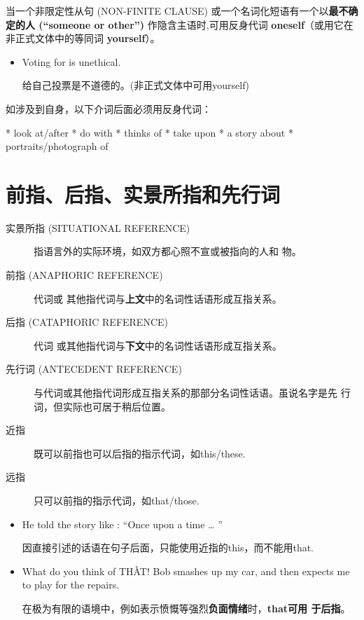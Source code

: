 当一个非限定性从句 (NON-FINITE CLAUSE) 或一个名词化短语有一个以\textbf{最不确
  定的人 (``someone or other'') }作隐含主语时,可用反身代词
\textbf{oneself}（或用它在非正式文体中的等同词 \textbf{yourself}）。
\begin{itemize}
\item Voting for  is unethical.

  给自己投票是不道德的。(非正式文体中可用yourself)
\end{itemize}

如涉及到自身，以下介词后面必须用反身代词：
\begin{taskitem}
  * look at/after
  * do with
  * thinks of
  * take upon
  * a story about
  * portraits/photograph of
\end{taskitem}

\section{前指、后指、实景所指和先行词}
\label{sec:anacata}

\begin{description}
\item[实景所指 (SITUATIONAL REFERENCE)] 指语言外的实际环境，如双方都心照不宣或被指向的人和
  物。
\item[前指 (ANAPHORIC REFERENCE)] 代词或
  其他指代词与\textbf{上文}中的名词性话语形成互指关系。
\item[后指 (CATAPHORIC REFERENCE)] 代词
  或其他指代词与\textbf{下文}中的名词性话语形成互指关系。
\item[先行词 (ANTECEDENT REFERENCE)] 与代词或其他指代词形成互指关系的那部分名词性话语。虽说名字是先
  行词，但实际也可居于稍后位置。
\item[近指]  既可以前指也可以后指的指示代词，如this/these.
\item[远指]  只可以前指的指示代词，如that/those.
\end{description}

\begin{itemize}

\item He told the story like : ``Once upon a time \ldots{} ''

  因直接引述的话语在句子后面，只能使用近指的this，而不能用that.

\item What do you think of TH\`{A}T! Bob smashes up my car, and then expects me to
  play for the repairs.

  在极为有限的语境中，例如表示愤慨等强烈\textbf{负面情绪}时，\textbf{that可用
    于后指}。
\end{itemize}

